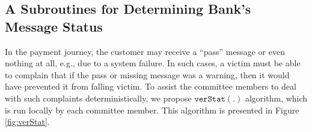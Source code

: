 
\vspace{-3.1mm}
\subsection{A Subroutines for Determining Bank's Message Status}
\vspace{-.5mm}
In the payment journey, the customer may receive a ``pass'' message or even nothing at all, e.g., due to a system failure. In such cases,  a victim  must be able to complain that if the pass or missing message was   a warning, then it   would have prevented it  from falling victim. To assist the committee members to deal with  such complaints deterministically, we propose    $\mathtt{verStat}(.)$ algorithm, which is run locally by each committee member. This algorithm is presented in Figure \ref{fig:verStat}. 


